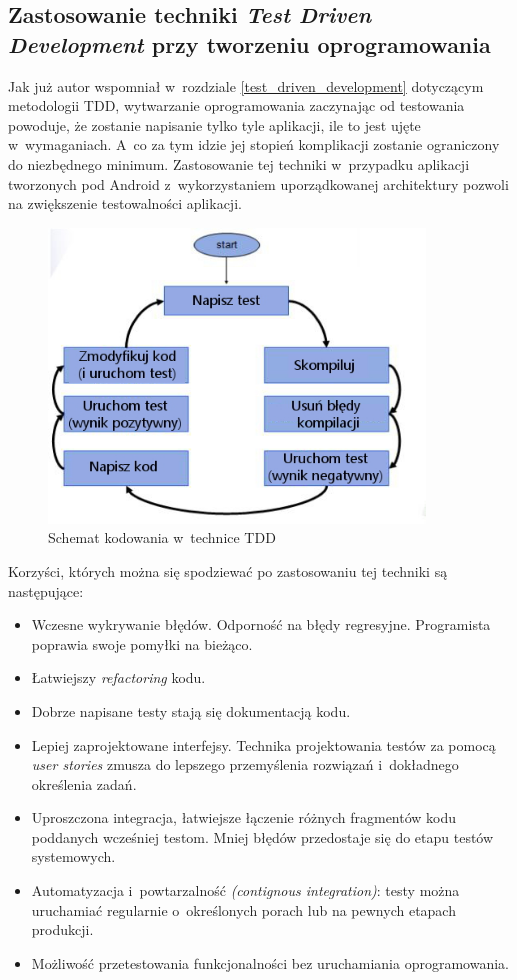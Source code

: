 \subsection{Zastosowanie techniki \textit{Test Driven Development} \newline przy tworzeniu oprogramowania}
Jak już autor wspomniał w~rozdziale \ref{test_driven_development} dotyczącym metodologii TDD, wytwarzanie oprogramowania zaczynając od testowania powoduje, że zostanie napisanie tylko tyle aplikacji, ile to jest ujęte w~wymaganiach. A~co za tym idzie jej stopień komplikacji zostanie ograniczony do niezbędnego minimum. Zastosowanie tej techniki w~przypadku aplikacji tworzonych pod Android z~wykorzystaniem uporządkowanej architektury pozwoli na zwiększenie testowalności aplikacji. 

\begin{figure}[!htb]
    \centering
    \includegraphics[width=10cm]{imgs/ch4_tdd.jpg}
    \caption
{Schemat kodowania w~technice TDD}
    \label{fig:tdd_schema}
\end{figure} 

Korzyści, których można się spodziewać po zastosowaniu tej techniki są następujące:

\begin{itemize}
\item
Wczesne wykrywanie błędów. Odporność na błędy regresyjne. Programista poprawia swoje pomyłki na bieżąco.
\item
Łatwiejszy \textit{refactoring} kodu.
\item
Dobrze napisane testy stają się dokumentacją kodu.
\item
Lepiej zaprojektowane interfejsy. Technika projektowania testów za pomocą \textit{user stories} zmusza do lepszego przemyślenia rozwiązań i~dokładnego określenia zadań. 
\item
Uproszczona integracja, łatwiejsze łączenie różnych fragmentów kodu poddanych wcześniej testom. Mniej błędów przedostaje się do etapu testów systemowych.
\item
Automatyzacja i~powtarzalność \textit{(contignous integration)}: testy można uruchamiać regularnie o~określonych porach lub na pewnych etapach produkcji. 
\item
Możliwość przetestowania funkcjonalności bez uruchamiania oprogramowania.
\end{itemize}


